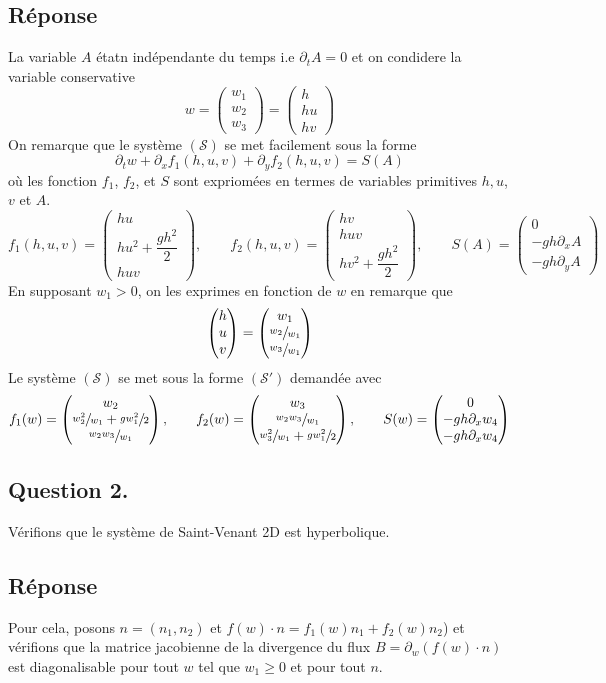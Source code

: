 \documentclass[
	french,
	11pt, %
]{fphw}
\newcommand{\myvec}[3]{\begin{pmatrix} #1  \\ #2 \\ #3 \end{pmatrix}}   %
\renewcommand{\vector}[4]{\begin{pmatrix} #1  \\ #2 \\ #3 \end{pmatrix}}   %
\begin{document}
\subsection*{Réponse} 

La variable $A$ étatn indépendante du temps i.e $\partial_t A = 0$ et on condidere la variable conservative 
$$w= \vector{w_1}{w_2}{w_3}{w_4} = \vector{h}{hu}{hv}{A}$$
On remarque que le système $(\mathcal{S})$ se met facilement sous la forme
$$
\partial_t w + \partial_x f_1(h,u,v) + \partial_y f_2(h,u,v) = S(A)
$$
où les fonction $f_1$, $f_2$, et $S$ sont expriomées en termes de variables primitives $h, u$, $v$ et $A$. 
$$f_1(h,u,v) = \vector{hu}{hu^2 + \dfrac{gh^2}{2}}{huv}{0}, \qquad f_2(h,u,v) = \myvec{hv}{huv}{hv^2 + \dfrac{gh^2}{2}}, \qquad S(A) = \vector{0}{-gh\partial_xA}{-gh\partial_y A}{0}$$
En supposant $w_1>0$, on les exprimes en fonction de $w$ en remarque que $$\vector{h}{u}{v}{A} = \vector{w_1}{\sfrac{w_2}{w_1}}{\sfrac{w_3}{w_1}}{w_4}$$
Le système $(\mathcal{S})$ se met sous la forme $(\mathcal{S}')$ demandée avec 
$$f_1(w) = \vector{w_2}{\sfrac{w_2^2}{w_1} + \sfrac{gw_1^2}{2}}{\sfrac{w_2w_3}{w_1}}{0}, \qquad f_2(w) = \vector{w_3}{\sfrac{w_2w_3}{w_1}}{\sfrac{w_3^2}{w_1} + \sfrac{gw_1^2}{2}}{0}, \qquad S(w)=\vector{0}{-gh\partial_x w_4}{-gh\partial_x w_4}{0}$$



\subsection*{Question 2.}

\begin{problem}
Vérifions que le système de Saint-Venant 2D est hyperbolique.
\end{problem}


\subsection*{Réponse} 
Pour cela, posons $n=(n_1,n_2)$ et $f(w)\cdot n = f_1(w)n_1 + f_2(w)n_2$) et vérifions que la matrice jacobienne de la divergence du flux $B = \partial_w \left( f(w)\cdot n \right)$ est diagonalisable pour tout $w$ tel que $w_1 \geq 0$ et pour tout $n$. 
\end{document}
